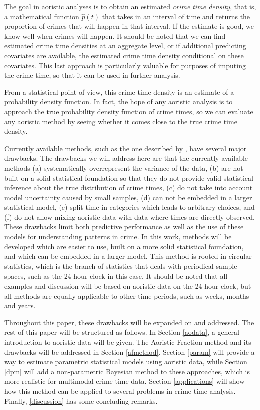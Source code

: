The goal in  aoristic analyses is to obtain an estimated \textit{crime time density}, that is, a mathematical function $\hat{p}(t)$ that takes in an interval of time and returns the proportion of crimes that will happen in that interval. If the estimate is good, we know well when crimes will happen. It should be noted that we can find estimated crime time densities at an aggregate level, or if additional predicting covariates are available, the estimated crime time density conditional on these covariates. This last approach is particularly valuable for purposes of imputing the crime time, so that it can be used in further analysis.

From a statistical point of view, this crime time density is an estimate of a probability density function. In fact, the hope of any aoristic analysis is to approach the true probability density function of crime times, so we can evaluate any aoristic method by seeing whether it comes close to the true crime time density.



Currently available methods, such as the one described by \citet{ashby2013comparison}, have several major drawbacks. The drawbacks we will address here are that the currently available methods (a) systematically overrepresent the variance of the data, (b)  are not built on a solid statistical foundation so that they do not provide valid statistical inference about the true distribution of crime times, (c) do not take into account model uncertainty caused by small samples, (d) can not  be embedded  in a larger statistical model, (e) split time in categories which leads to arbitrary choices, and (f) do not allow mixing aoristic data with data where times are directly observed. These drawbacks limit both predictive performance as well as the use of these models for understanding patterns in crime. In this work, methods will be developed which are easier to use, built on a more solid statistical foundation, and which can be embedded in a larger model. This method is rooted in circular statistics, which is the branch of statistics that deals with periodical sample spaces, such as the 24-hour clock in this case. It should be noted that all examples and discussion will be based on aoristic data on the 24-hour clock, but all methods are equally applicable to other time periods, such as weeks, months and years.

Throughout this paper, these drawbacks will be expanded on and addressed. The rest of this paper will be structured as follows. In Section \ref{aodata}, a general introduction to aoristic data will be given. The Aoristic Fraction method and its drawbacks will be addressed in Section \ref{afmethod}. Section \ref{param} will provide a way to estimate parametric statistical models using aoristic data, while Section \ref{dpm} will add a non-parametric Bayesian method to these approaches, which is more realistic for multimodal crime time data. Section \ref{applications} will show how this method can be applied to several problems in crime time analysis. Finally, \ref{discussion} has some concluding remarks.






